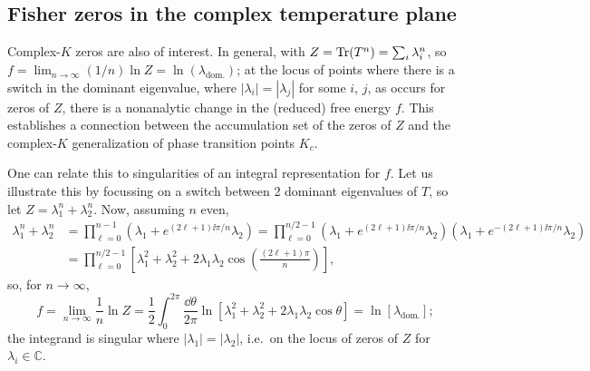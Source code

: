 \begin{diagram}
\end{diagram}

\subsection{Fisher zeros in the complex temperature plane}

Complex-$K$ zeros are also of interest. In general, with $Z = \operatorname{Tr}(T^n) = \sum_i\lambda_i^n$, so
$f = \lim_{n\to\infty}(1/n)\ln Z = \ln(\lambda_{\text{dom.}})$; at the locus of points where there is a switch in
the dominant eigenvalue, where $|\lambda_i| = |\lambda_j|$ for some $i$, $j$, as occurs for zeros of $Z$, there is a
nonanalytic change in the (reduced) free energy $f$. This establishes a connection between the accumulation set of
the zeros of $Z$ and the complex-$K$ generalization of phase transition points $K_c$.

One can relate this to singularities of an integral representation for $f$. Let us illustrate this by focussing on
a switch between 2 dominant eigenvalues of $T$, so let $Z = \lambda_1^n+\lambda_2^n$. Now, assuming $n$ even,
\begin{align}
  \lambda_1^n+\lambda_2^n &= \prod_{\ell=0}^{n-1}\left(\lambda_1 + e^{(2\ell+1)\ii\pi/n}\lambda_2\right)
   = \prod_{\ell=0}^{n/2-1}\left(\lambda_1 + e^{(2\ell+1)\ii\pi/n}\lambda_2\right)\left(\lambda_1 + e^{-(2\ell+1)\ii\pi/n}\lambda_2\right)\nonumber\\
  &= \prod_{\ell=0}^{n/2-1}\left[\lambda_1^2+\lambda_2^2+2\lambda_1\lambda_2\cos\left(\frac{(2\ell+1)\pi}{n}\right)\right],
\end{align}
so, for $n\to\infty$,
\begin{equation}
  f = \lim_{n\to\infty}\frac{1}{n}\ln Z = \frac{1}{2}\int_0^{2\pi}\frac{\dd\theta}{2\pi}\ln\left[\lambda_1^2+\lambda_2^2+2\lambda_1\lambda_2\cos\theta\right]
  = \ln[\lambda_{\text{dom.}}];
\end{equation}
the integrand is singular where $|\lambda_1| = |\lambda_2|$, i.e.\ on the locus of zeros of $Z$ for
$\lambda_i\in\mathbb C$.

